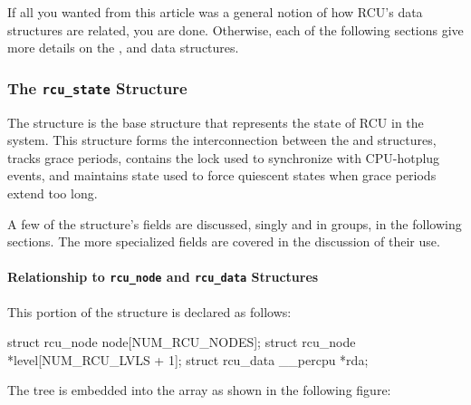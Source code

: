 If all you wanted from this article was a general notion of how RCU's
data structures are related, you are done.
Otherwise, each of the
following sections give more details on the , 
and  data structures.

\subsubsection{The \texttt{rcu\_state} Structure}

The  structure is the base structure that represents the
state of RCU in the system.
This structure forms the interconnection
between the  and  structures, tracks grace
periods, contains the lock used to synchronize with CPU-hotplug events,
and maintains state used to force quiescent states when grace periods
extend too long.

A few of the  structure's fields are discussed, singly and
in groups, in the following sections. The more specialized fields are
covered in the discussion of their use.

\paragraph{Relationship to \texttt{rcu\_node} and \texttt{rcu\_data} Structures}

This portion of the  structure is declared as follows:

\begin{VerbatimN}
		struct rcu_node node[NUM_RCU_NODES];
		struct rcu_node *level[NUM_RCU_LVLS + 1];
		struct rcu_data __percpu *rda;
\end{VerbatimN}

\QuickQuizEnd

The  tree is embedded into the  array as shown
in the following figure:

\begin{center}
\end{center}


